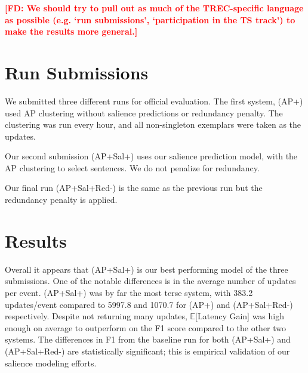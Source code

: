 \documentclass{sig-alternate}
\newcommand{\fdcomment}[1]{\textbf{\textcolor{red}{[FD: #1]}}}
\begin{document}



\fdcomment{We should try to pull out as much of the TREC-specific language as possible (e.g. `run submissions', `participation in the TS track') to make the results more general.}













\section{Run Submissions}

We submitted three different runs for official evaluation. The first system,
(AP+) used AP clustering without salience predictions or redundancy penalty.
The clustering was run every hour, and all non-singleton exemplars were 
taken as the updates.

Our second submission (AP+Sal+) uses our salience prediction model, with the
AP clustering to select sentences. We do not penalize for redundancy.

Our final run (AP+Sal+Red-) is the same as the previous run but the 
redundancy penalty is applied.

\section{Results}

Overall it appears that (AP+Sal+) is our best performing model of the three
submissions. One of the notable differences is in the average number of 
updates per event. (AP+Sal+) was by far the most terse system, with 
383.2 updates/event compared to 5997.8 and 1070.7 for (AP+) and (AP+Sal+Red-)
respectively.
Despite not returning many updates, $\mathbb{E}$[Latency Gain] was high enough
on average to outperform on the F1 score compared to the other two systems.
The differences in F1 from the baseline run for both (AP+Sal+) and 
(AP+Sal+Red-) are statistically significant; 
this is empirical validation of our salience modeling efforts.
\end{document}

